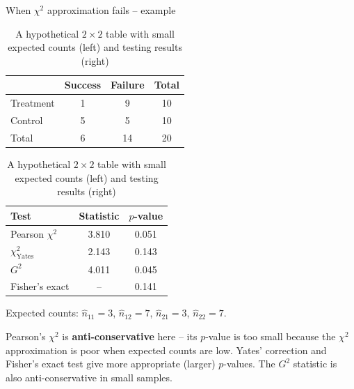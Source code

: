 \documentclass[10pt,ignorenonframetext,aspectratio=169]{beamer}
\begin{document}
\begin{frame}{When $\chi^2$ approximation fails -- example}

\begin{table}[h]
\centering
\caption{A hypothetical $2 \times 2$ table with small expected counts (left) and testing results (right)}
\small
\begin{tabular}{lccc}
\hline
 & Success & Failure & Total \\
\hline
Treatment & 1 & 9 & 10 \\
Control   & 5 & 5 & 10 \\
\hline
Total     & 6 & 14 & 20 \\
\hline
\end{tabular}
%
\hspace{1cm}
\begin{tabular}{lcc}
\hline
Test & Statistic & $p$-value \\
\hline
Pearson $\chi^2$ & 3.810 & 0.051 \\
$\chi^2_{\text{Yates}}$ & 2.143 & 0.143 \\
$G^2$ & 4.011 & 0.045 \\
Fisher's exact & -- & 0.141 \\
\hline
\end{tabular}
\end{table}

Expected counts: $\hat{n}_{11} = 3$, $\hat{n}_{12} = 7$, $\hat{n}_{21} = 3$, $\hat{n}_{22} = 7$.

\vspace{0.3cm}

\small
Pearson's $\chi^2$ is \textbf{anti-conservative} here -- its $p$-value is too small because the $\chi^2$ approximation is poor when expected counts are low. Yates' correction and Fisher's exact test give more appropriate (larger) $p$-values. The $G^2$ statistic is also anti-conservative in small samples.

\end{frame}
\end{document}
